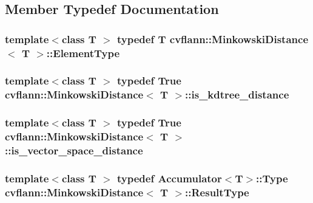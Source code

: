 \subsection{Member Typedef Documentation}
\hypertarget{structcvflann_1_1MinkowskiDistance_ade76f2298b0f811a466afdf72b18846b}{
\subsubsection[{Element\-Type}]{\setlength{\rightskip}{0pt plus 5cm}template$<$class T $>$ typedef {\bf T} {\bf cvflann\-::\-Minkowski\-Distance}$<$ {\bf T} $>$\-::{\bf Element\-Type}}}\label{structcvflann_1_1MinkowskiDistance_ade76f2298b0f811a466afdf72b18846b}
\hypertarget{structcvflann_1_1MinkowskiDistance_ab0f43baaf0a36a5598a88b2ee55a3e01}{
\subsubsection[{is\-\_\-kdtree\-\_\-distance}]{\setlength{\rightskip}{0pt plus 5cm}template$<$class T $>$ typedef {\bf True} {\bf cvflann\-::\-Minkowski\-Distance}$<$ {\bf T} $>$\-::{\bf is\-\_\-kdtree\-\_\-distance}}}\label{structcvflann_1_1MinkowskiDistance_ab0f43baaf0a36a5598a88b2ee55a3e01}
\hypertarget{structcvflann_1_1MinkowskiDistance_a84506bd48e3b43e87d56e9b60d9fb464}{
\subsubsection[{is\-\_\-vector\-\_\-space\-\_\-distance}]{\setlength{\rightskip}{0pt plus 5cm}template$<$class T $>$ typedef {\bf True} {\bf cvflann\-::\-Minkowski\-Distance}$<$ {\bf T} $>$\-::{\bf is\-\_\-vector\-\_\-space\-\_\-distance}}}\label{structcvflann_1_1MinkowskiDistance_a84506bd48e3b43e87d56e9b60d9fb464}
\hypertarget{structcvflann_1_1MinkowskiDistance_a21baf56e06b45cdea5de1530c2e7c0ec}{
\subsubsection[{Result\-Type}]{\setlength{\rightskip}{0pt plus 5cm}template$<$class T $>$ typedef {\bf Accumulator}$<${\bf T}$>$\-::Type {\bf cvflann\-::\-Minkowski\-Distance}$<$ {\bf T} $>$\-::{\bf Result\-Type}}}\label{structcvflann_1_1MinkowskiDistance_a21baf56e06b45cdea5de1530c2e7c0ec}


